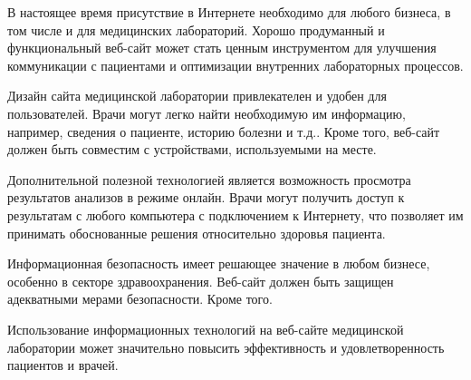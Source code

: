 В настоящее время присутствие в Интернете необходимо для любого бизнеса, в том числе и для медицинских лабораторий. Хорошо продуманный и функциональный веб-сайт может стать ценным инструментом для улучшения коммуникации с пациентами и оптимизации внутренних лабораторных процессов.

Дизайн сайта медицинской лаборатории привлекателен и удобен для пользователей. Врачи могут легко найти необходимую им информацию, например, сведения о пациенте, историю болезни и т.д.. Кроме того, веб-сайт должен быть совместим с устройствами, используемыми на месте.

Дополнительной полезной технологией является возможность просмотра результатов анализов в режиме онлайн. Врачи могут получить доступ к результатам с любого компьютера с подключением к Интернету, что позволяет им принимать обоснованные решения относительно здоровья пациента.

Информационная безопасность имеет решающее значение в любом бизнесе, особенно в секторе здравоохранения. Веб-сайт должен быть защищен адекватными мерами безопасности. Кроме того.

Использование информационных технологий на веб-сайте медицинской лаборатории может значительно повысить эффективность и удовлетворенность пациентов и врачей.